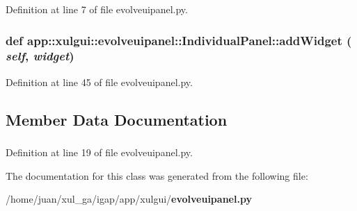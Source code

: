 Definition at line 7 of file evolveuipanel.py.
\subsubsection{\setlength{\rightskip}{0pt plus 5cm}def app::xulgui::evolveuipanel::IndividualPanel::addWidget ( {\em self},  {\em widget})}\label{classapp_1_1xulgui_1_1evolveuipanel_1_1IndividualPanel_8a40c2fe68794b6c5eec690c23f3a6e9}




Definition at line 45 of file evolveuipanel.py.

\subsection{Member Data Documentation}
\subsubsection{}\label{classapp_1_1xulgui_1_1evolveuipanel_1_1IndividualPanel_a77ebcb5b507101e17cf70cec6b518ed}




Definition at line 19 of file evolveuipanel.py.

The documentation for this class was generated from the following file:\begin{CompactItemize}
\item 
/home/juan/xul\_\-ga/igap/app/xulgui/{\bf evolveuipanel.py}\end{CompactItemize}
